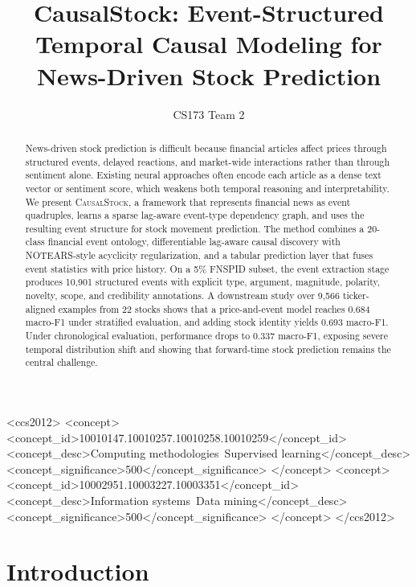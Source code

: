 \documentclass[sigconf,review]{acmart}
\title{CausalStock: Event-Structured Temporal Causal Modeling for News-Driven Stock Prediction}
\author{CS173 Team 2}
\begin{document}
\begin{abstract}
News-driven stock prediction is difficult because financial articles affect prices through structured events, delayed reactions, and market-wide interactions rather than through sentiment alone. Existing neural approaches often encode each article as a dense text vector or sentiment score, which weakens both temporal reasoning and interpretability. We present \textsc{CausalStock}, a framework that represents financial news as event quadruples, learns a sparse lag-aware event-type dependency graph, and uses the resulting event structure for stock movement prediction. The method combines a 20-class financial event ontology, differentiable lag-aware causal discovery with NOTEARS-style acyclicity regularization, and a tabular prediction layer that fuses event statistics with price history. On a 5\% FNSPID subset, the event extraction stage produces 10{,}901 structured events with explicit type, argument, magnitude, polarity, novelty, scope, and credibility annotations. A downstream study over 9{,}566 ticker-aligned examples from 22 stocks shows that a price-and-event model reaches 0.684 macro-F1 under stratified evaluation, and adding stock identity yields 0.693 macro-F1. Under chronological evaluation, performance drops to 0.337 macro-F1, exposing severe temporal distribution shift and showing that forward-time stock prediction remains the central challenge.
\end{abstract}

\begin{CCSXML}
<ccs2012>
 <concept>
  <concept_id>10010147.10010257.10010258.10010259</concept_id>
  <concept_desc>Computing methodologies~Supervised learning</concept_desc>
  <concept_significance>500</concept_significance>
 </concept>
 <concept>
  <concept_id>10002951.10003227.10003351</concept_id>
  <concept_desc>Information systems~Data mining</concept_desc>
  <concept_significance>500</concept_significance>
 </concept>
</ccs2012>
\end{CCSXML}


\maketitle

\section{Introduction}
\end{document}
